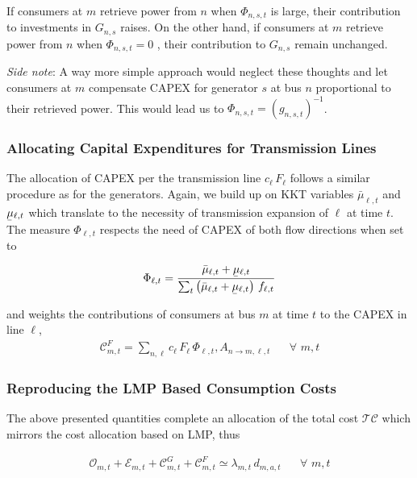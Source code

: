 \documentclass[11pt]{article}
\newcommand{\ubar}[1]{\underaccent{\bar}{#1}}
\newcommand{\generation}{g_{n,s,t}}
\newcommand{\capacityGeneration}{G_{n,s}}
\newcommand{\capacityFlow}{F_{\ell}}
\newcommand{\capexFlow}{c_{\ell}}
\newcommand{\demand}[1][n]{d_{#1,a,t}}
\newcommand{\mulowerflow}{\ubar{\mu}_{\ell,t}}
\newcommand{\muupperflow}{\bar{\mu}_{\ell,t}}
\newcommand{\lmp}[1][n]{\lambda_{#1,t}}
\newcommand{\flow}{f_{\ell,t}}
\newcommand{\allocateTransaction}[1][n \rightarrow m]{A_{#1,\ell,t}}
\newcommand{\allocateCapexGeneration}{\mathcal{C}^{G}_{m,t}}
\newcommand{\allocateCapexFlow}{\mathcal{C}^{F}_{m,t}}
\newcommand{\allocateOpex}{\mathcal{O}_{m,t}}
\newcommand{\allocateEmissionCost}{\mathcal{E}_{m,t}}
\newcommand{\totalcost}{\mathcal{TC}}
\newcommand{\impactcapexgeneration}{\Phi_{n,s,t}}
\newcommand{\impactcapexflow}{\Phi_{\ell,t}}
\newcommand{\Forall}[1]{\hspace{20pt} \forall \,\, #1 }
\begin{document}
\noindent
If consumers at $m$ retrieve power from $n$ when $\impactcapexgeneration$ is large, their contribution to investments in $\capacityGeneration$ raises. On the other hand, if consumers at $m$ retrieve power from $n$ when $\impactcapexgeneration=0$ , their contribution to $\capacityGeneration$ remain unchanged. 

\noindent
\textit{Side note}: A way more simple approach would neglect these thoughts and let  consumers at $m$ compensate CAPEX for generator $s$ at bus $n$ proportional to their retrieved power. This would lead us to $ \impactcapexgeneration = \left( \generation\right)^{-1}$. 

\subsubsection*{Allocating Capital Expenditures for Transmission Lines}
The allocation of CAPEX per the transmission line $\capexFlow \, \capacityFlow $ follows a similar procedure as for the generators. Again, we build up on KKT variables $\muupperflow$ and $\mulowerflow$ which translate to the necessity of transmission expansion of $\ell$ at time $t$. The measure $\impactcapexflow$ respects the need of CAPEX of both flow directions when set to 

\begin{align}
    \impactcapexflow = \dfrac{\muupperflow + \mulowerflow}{\sum_t \left( \muupperflow + \mulowerflow \right) \, \flow}
\end{align}

and weights the contributions of consumers at bus $m$ at time $t$ to the CAPEX in line $\ell$,
\begin{align}
    \allocateCapexFlow = \sum_{n,\ell} \capexFlow \, \capacityFlow\, \impactcapexflow, \allocateTransaction \Forall{m,t} \label{eq:allocate_capexFlow}
\end{align}

\subsubsection*{Reproducing the LMP Based Consumption Costs}
The above presented quantities complete an allocation of the total cost $\totalcost$ which mirrors the cost allocation based on LMP, thus 

\begin{align}
 \allocateOpex + \allocateEmissionCost + \allocateCapexGeneration + \allocateCapexFlow \simeq \lmp[m] \, \demand[m] \Forall{m,t} 
 \label{eq:allocated_cost_mirror_lmp}
\end{align}
\end{document}
